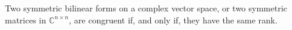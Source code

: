 Two symmetric bilinear forms on a complex vector space, or two symmetric matrices in $\mathbb{C}^{n \times n}$, are congruent if, and only if, they have the same rank.
